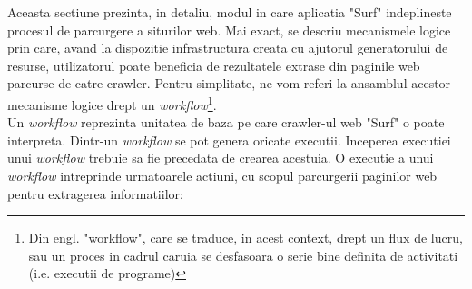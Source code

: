 Aceasta sectiune prezinta, in detaliu, modul in care aplicatia "Surf" indeplineste procesul de parcurgere a siturilor web. Mai exact, se descriu mecanismele logice prin care, avand la dispozitie infrastructura creata cu ajutorul generatorului de resurse, utilizatorul poate beneficia de rezultatele extrase din paginile web parcurse de catre crawler. Pentru simplitate, ne vom referi la ansamblul acestor mecanisme logice drept un \textit{workflow}\footnote{Din engl. "workflow", care se traduce, in acest context, drept un flux de lucru, sau un proces in cadrul caruia se desfasoara o serie bine definita de activitati (i.e. executii de programe)}.
\\

Un \textit{workflow} reprezinta unitatea de baza pe care crawler-ul web "Surf" o poate interpreta. Dintr-un \textit{workflow} se pot genera oricate executii. Inceperea executiei unui \textit{workflow} trebuie sa fie precedata de crearea acestuia. O executie a unui \textit{workflow} intreprinde urmatoarele actiuni, cu scopul parcurgerii paginilor web pentru extragerea informatiilor:

